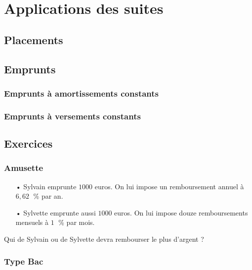 \ifdefined\COMPLETE
\else
    
    
\fi


\section{Applications des suites}

\subsection{Placements}

\subsection{Emprunts}

\subsubsection{Emprunts à amortissements constants}

\subsubsection{Emprunts à versements constants}

\subsection{Exercices}

\subsubsection{Amusette}

\begin{itemize}
\item[•] Sylvain emprunte $1 000$ euros. On lui impose un remboursement annuel à $6,62 \;$ \% par an. \\
\item[•] Sylvette emprunte aussi $1 000$ euros. On lui impose douze remboursements mensuels à $1 \;$ \% par mois. \\
\end{itemize}

Qui de Sylvain ou de Sylvette devra rembourser le plus d'argent ? \\

\subsubsection{Type Bac}

